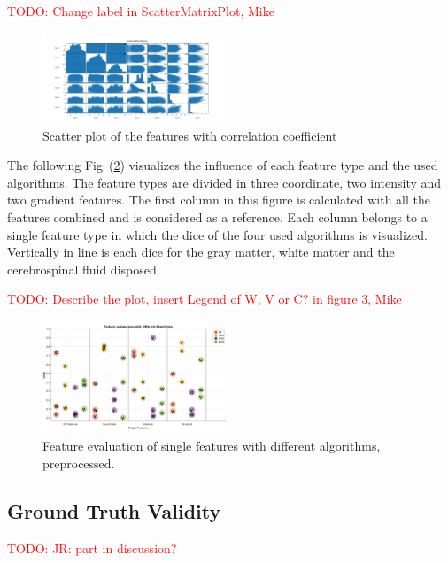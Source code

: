 \documentclass[journal]{IEEEtran}
\newcommand\TODO[1]{\textcolor{red}{TODO: #1}}
\begin{document}
\TODO{Change label in ScatterMatrixPlot, Mike}

\begin{figure}[h]
	\centering
	\includegraphics[width=0.49\textwidth]{images/ScatterPlotMatrix}
	\caption{Scatter plot of the features with correlation coefficient}
	\label{scatterplot}
\end{figure}

The following Fig~(\ref{FeatEval}) visualizes the influence of each feature type and the used algorithms. The feature types are divided in three coordinate, two intensity and two gradient features. The first column in this figure is calculated with all the features combined and is considered as a reference. Each column belongs to a single feature type in which the dice of the four used algorithms is visualized. Vertically in line is each dice for the gray matter, white matter and the cerebrospinal fluid disposed.

\TODO{Describe the plot, insert Legend of W, V or C? in figure 3, Mike}
\begin{figure}[h]
	\centering
	\includegraphics[width=0.49\textwidth]{images/FeatureEvaluation}
	\caption{Feature evaluation of single features with different algorithms, preprocessed.}
	\label{FeatEval}
\end{figure}



\subsection{Ground Truth Validity}
\TODO{JR: part in discussion?}
\end{document}
